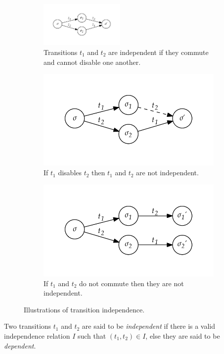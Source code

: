\documentclass[12pt,a4paper,twoside,openright]{report}
\begin{document}
\begin{figure}
	\centering
	\begin{subfigure}{\textwidth}
		\centering
		\includegraphics*[width=0.45\textwidth]{independence1}
		\caption{Transitions $t_1$ and $t_2$ are independent if
			they commute and cannot disable one another.}
	\end{subfigure}
	\begin{subfigure}{.45\textwidth}
		\centering
		\includegraphics*[width=\textwidth]{independence2}
		\caption{If $t_1$ disables $t_2$ then $t_1$ and $t_2$
			are not independent.}
	\end{subfigure}
	\quad
	\begin{subfigure}{.45\textwidth}
		\centering
		\includegraphics*[width=\textwidth]{independence3}
		\caption{If $t_1$ and $t_2$ do not commute then they
			are not independent.}
	\end{subfigure}
	\caption{Illustrations of transition independence.}
	\label{fig:independence}
\end{figure}
Two transitions $t_1$ and $t_2$ are said to be \emph{independent}
if there is a valid independence relation $I$ such that $(t_1, t_2) \in I$,
else they are said to be \emph{dependent}.
\end{document}
